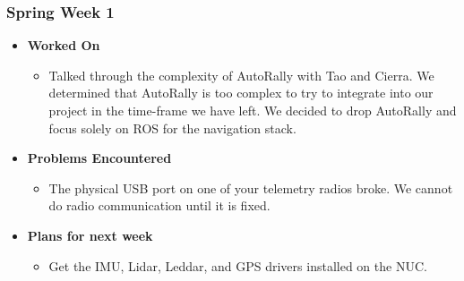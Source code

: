 \documentclass{article}
\begin{document}
\subsubsection{Spring Week 1}
\begin{itemize}
    \item {\textbf{Worked On}}
    \begin{itemize}
        \item Talked through the complexity of AutoRally with Tao and Cierra. We determined that AutoRally is too complex to try to integrate into our project in the time-frame we have left. We decided to drop AutoRally and focus solely on ROS for the navigation stack.
    \end{itemize}

    \item {\textbf{Problems Encountered}}
    \begin{itemize}
        \item The physical USB port on one of your telemetry radios broke. We cannot do radio communication until it is fixed.
    \end{itemize}

    \item{\textbf{Plans for next week}}
    \begin{itemize}
        \item Get the IMU, Lidar, Leddar, and GPS drivers installed on the NUC.
    \end{itemize}
\end{itemize}
\end{document}
